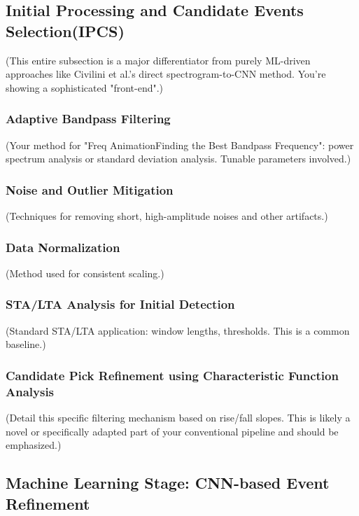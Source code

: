 \documentclass[conference]{IEEEtran}
\begin{document}
    \subsection{Initial Processing and Candidate Events Selection(IPCS)}%
    (This entire subsection is a major differentiator from purely ML-driven approaches like Civilini et al.'s direct
    spectrogram-to-CNN method. You're showing a sophisticated "front-end".)
    
        \subsubsection{Adaptive Bandpass Filtering}
        (Your method for "Freq AnimationFinding the Best Bandpass Frequency": power spectrum analysis or standard
            deviation analysis. Tunable parameters involved.)

            \subsubsection{Noise and Outlier Mitigation}
            (Techniques for removing short, high-amplitude noises and other artifacts.)

        \subsubsection{Data Normalization}
            (Method used for consistent scaling.)

        \subsubsection{STA\slash LTA Analysis for Initial Detection}
            (Standard STA\slash LTA application: window lengths, thresholds. This is a common baseline.)

        \subsubsection{Candidate Pick Refinement using Characteristic Function Analysis}
        \label{sec:candidate_refinement}
            (Detail this specific filtering mechanism based on rise/fall slopes. This is likely a novel or specifically
            adapted part of your conventional pipeline and should be emphasized.)
            
    \subsection{Machine Learning Stage: CNN-based Event Refinement}
\end{document}
